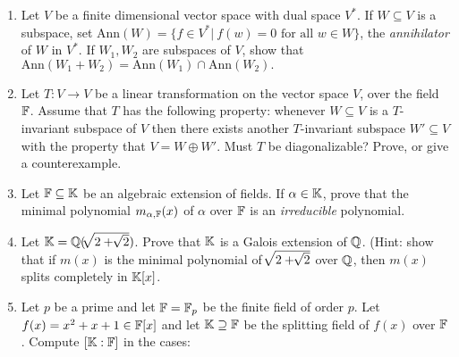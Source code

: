 \documentclass{article}
\begin{document}
\begin{Large}
\begin{enumerate}
\item Let $V$ be a finite dimensional vector space with dual space $V^*$.
If $W\subseteq V$ is a subspace, set $\mbox{Ann}(W)=\{f\in V^*|\ f(w)=
0 \mbox{ for all }w\in W\}$, the {\em annihilator} of $W$ in $V^*$.
If $W_1,W_2$ are subspaces of $V$, show that $\mbox{Ann}(W_1+W_2)=
\mbox{Ann}(W_1)\cap \mbox{Ann}(W_2).$ 

\item Let $T:V\to V$ be a linear transformation on the vector space $V$,
over the field ${\Bbb F}$. Assume that $T$ has the following property:
whenever $W\subseteq V$ is a $T$-invariant subspace of $V$ then
there exists another $T$-invariant subspace $W'\subseteq V$ with the
property that $V=W\oplus W'$. Must $T$ be diagonalizable? Prove, or give
a counterexample.

\item Let ${\Bbb F}\subseteq {\Bbb K}$ be an algebraic extension of
fields. If $\alpha\in {\Bbb K}$, prove that the minimal polynomial
$m_{\alpha ,{\Bbb F}}(x)$ of $\alpha $ over ${\Bbb F}$ is an
{\em irreducible} polynomial.


\item Let ${\Bbb K}={\Bbb Q}(\root\of{2+\root\of 2})$. Prove that
${\Bbb K}$ is a Galois extension of ${\Bbb Q}$. (Hint: show that
if $m(x)$ is the minimal polynomial of $\root\of{2+\root\of 2}$ over
${\Bbb Q}$, then $m(x)$ splits completely in ${\Bbb K}[x]$.

\item Let $p$ be a prime and let ${\Bbb F}={\Bbb F}_p$ be the finite field of
order $p$. Let $f(x)=x^2+x+1\in {\Bbb F}[x]$ and let ${\Bbb K}\supseteq
{\Bbb F}$ be the splitting field of $f(x)$ over ${\Bbb F}$.
Compute $[{\Bbb K}:{\Bbb F}] $ in the cases:
 


\end{enumerate}
\end{Large}
\end{document}
